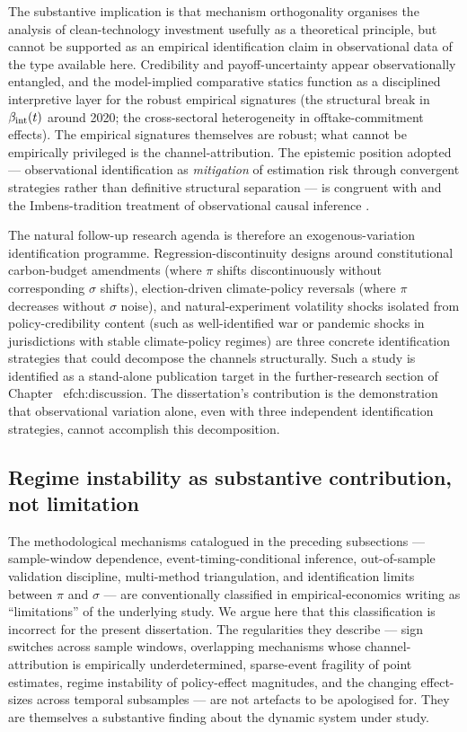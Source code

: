 The substantive implication is that mechanism orthogonality organises the analysis of clean-technology investment usefully as a theoretical principle, but cannot be supported as an empirical identification claim in observational data of the type available here. Credibility and payoff-uncertainty appear observationally entangled, and the model-implied comparative statics function as a disciplined interpretive layer for the robust empirical signatures (the structural break in $\beta_{\mathrm{int}}(t)$ around 2020; the cross-sectoral heterogeneity in offtake-commitment effects). The empirical signatures themselves are robust; what cannot be empirically privileged is the channel-attribution. The epistemic position adopted --- observational identification as \emph{mitigation} of estimation risk through convergent strategies rather than definitive structural separation --- is congruent with \cite{blasques2024mitigating} and the Imbens-tradition treatment of observational causal inference \cite{imbens2018causal}.

The natural follow-up research agenda is therefore an exogenous-variation identification programme. Regression-discontinuity designs around constitutional carbon-budget amendments (where $\pi$ shifts discontinuously without corresponding $\sigma$ shifts), election-driven climate-policy reversals (where $\pi$ decreases without $\sigma$ noise), and natural-experiment volatility shocks isolated from policy-credibility content (such as well-identified war or pandemic shocks in jurisdictions with stable climate-policy regimes) are three concrete identification strategies that could decompose the channels structurally. Such a study is identified as a stand-alone publication target in the further-research section of Chapter~
ef{ch:discussion}. The dissertation's contribution is the demonstration that observational variation alone, even with three independent identification strategies, cannot accomplish this decomposition.

\subsection{Regime instability as substantive contribution, not limitation}
\label{sec:disc-regime-instability-substantive}

The methodological mechanisms catalogued in the preceding subsections --- sample-window dependence, event-timing-conditional inference, out-of-sample validation discipline, multi-method triangulation, and identification limits between $\pi$ and $\sigma$ --- are conventionally classified in empirical-economics writing as ``limitations'' of the underlying study. We argue here that this classification is incorrect for the present dissertation. The regularities they describe --- sign switches across sample windows, overlapping mechanisms whose channel-attribution is empirically underdetermined, sparse-event fragility of point estimates, regime instability of policy-effect magnitudes, and the changing effect-sizes across temporal subsamples --- are not artefacts to be apologised for. They are themselves a substantive finding about the dynamic system under study.

